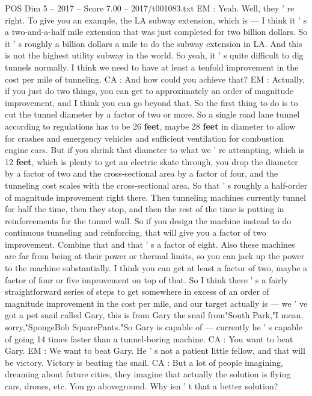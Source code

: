 \begin{textsample}{POS Dim 5 – 2017 – Score 7.00 – 2017/t001083.txt}
EM : Yeah.
Well, they ' re right.
To give you an example, the LA subway extension, which is — I think it ' s a two-and-a-half mile extension that was just completed for two billion dollars.
So it ' s roughly a billion dollars a mile to do the subway extension in LA.
And this is not the highest utility subway in the world.
So yeah, it ' s quite difficult to dig tunnels normally.
I think we need to have at least a tenfold improvement in the cost per mile of tunneling.
CA : And how could you achieve that?
EM : Actually, if you just do two things, you can get to approximately an order of magnitude improvement, and I think you can go beyond that.
So the first thing to do is to cut the tunnel diameter by a factor of two or more.
So a single road lane tunnel according to regulations has to be 26 \textbf{feet}, maybe 28 \textbf{feet} in diameter to allow for crashes and emergency vehicles and sufficient ventilation for combustion engine cars.
But if you shrink that diameter to what we ' re attempting, which is 12 \textbf{feet}, which is plenty to get an electric skate through, you drop the diameter by a factor of two and the cross-sectional area by a factor of four, and the tunneling cost scales with the cross-sectional area.
So that ' s roughly a half-order of magnitude improvement right there.
Then tunneling machines currently tunnel for half the time, then they stop, and then the rest of the time is putting in reinforcements for the tunnel wall.
So if you design the machine instead to do continuous tunneling and reinforcing, that will give you a factor of two improvement.
Combine that and that ' s a factor of eight.
Also these machines are far from being at their power or thermal limits, so you can jack up the power to the machine substantially.
I think you can get at least a factor of two, maybe a factor of four or five improvement on top of that.
So I think there ' s a fairly straightforward series of steps to get somewhere in excess of an order of magnitude improvement in the cost per mile, and our target actually is — we ' ve got a pet snail called Gary, this is from Gary the snail from"South Park,"I mean, sorry,"SpongeBob SquarePants."So Gary is capable of — currently he ' s capable of going 14 times faster than a tunnel-boring machine.
CA : You want to beat Gary.
EM : We want to beat Gary.
He ' s not a patient little fellow, and that will be victory.
Victory is beating the snail.
CA : But a lot of people imagining, dreaming about future cities, they imagine that actually the solution is flying cars, drones, etc.
You go aboveground.
Why isn ' t that a better solution?

\end{textsample}
